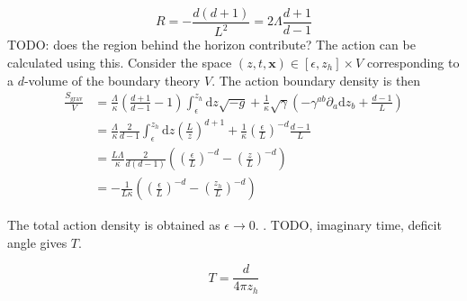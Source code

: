 \documentclass[12pt]{report}
\renewcommand{\d}{\ensuremath{\mathrm{d}}}
\begin{document}
\begin{equation}
 R=-\frac{d(d+1)}{L^2}=2\Lambda\frac{d+1}{d-1}
\end{equation}
TODO: does the region behind the horizon contribute?
The action can be calculated using this. Consider the space $(z,t,\mathbf{x})\in[\epsilon,z_h]\times V$ corresponding to a $d$-volume of the boundary theory $V$. The action boundary density is then
\begin{equation}
\begin{split}
 \frac{S_{\mathrm{grav}}}{V}&=\frac{\Lambda}{\kappa}\left(\frac{d+1}{d-1}-1\right)\int_\epsilon^{z_h}\d z\sqrt{-g}+
\frac{1}{\kappa}\sqrt{\gamma}\left(-\gamma^{ab}\partial_a\d z_b+\frac{d-1}{L}\right)\\
&=\frac{\Lambda}{\kappa}\frac{2}{d-1}\int_\epsilon^{z_h}\d z\left(\frac{L}{z}\right)^{d+1}+
\frac{1}{\kappa}\left(\frac{\epsilon}{L}\right)^{-d}\frac{d-1}{L}\\
&=\frac{L\Lambda}{\kappa}\frac{2}{d(d-1)}\left(\left(\frac{\epsilon}{L}\right)^{-d}-\left(\frac{z}{L}\right)^{-d}\right)\\
&=-\frac{1}{L\kappa}\left(\left(\frac{\epsilon}{L}\right)^{-d}-\left(\frac{z_h}{L}\right)^{-d}\right)
\end{split}
\end{equation}

The total action density is obtained as $\epsilon\rightarrow0$.
.  TODO, imaginary time, deficit angle gives $T$.


\begin{equation}
 T=\frac{d}{4\pi  z_h}\label{T}
\end{equation}
\end{document}
